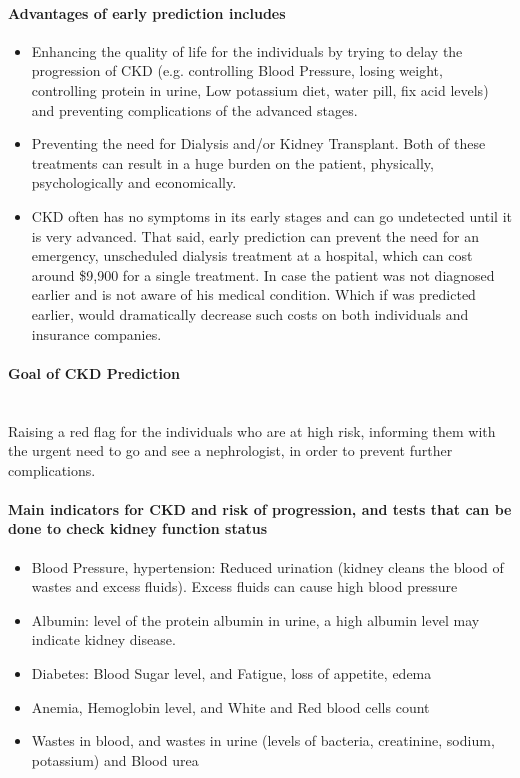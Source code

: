 \documentclass[11pt]{article}
\begin{document}
\paragraph{Advantages of early prediction includes}
\begin{itemize}
\item Enhancing the quality of life for the individuals by trying to delay the progression of CKD (e.g. controlling Blood Pressure, losing weight, controlling protein in urine, Low potassium diet, water pill, fix acid levels) and preventing complications of the advanced stages.
\item Preventing the need for Dialysis and/or Kidney Transplant. Both of these treatments can result in a huge burden on the patient, physically, psychologically and economically. 
\item CKD often has no symptoms in its early stages and can go undetected until it is very advanced. That said, early prediction can prevent the need for an emergency, unscheduled dialysis treatment at a hospital, which can cost around \$9,900 for a single treatment. In case the patient was not diagnosed earlier and is not aware of his medical condition. Which if was predicted earlier, would dramatically decrease such costs on both individuals and insurance companies. 
\end{itemize}

\paragraph{Goal of CKD Prediction} \mbox{}\\
Raising a red flag for the individuals who are at high risk, informing them with the urgent need to go and see a nephrologist, in order to prevent further complications.

\paragraph{Main indicators for CKD and risk of progression, and tests that can be done to check kidney function status}
\begin{itemize}
\item Blood Pressure, hypertension: Reduced urination (kidney cleans the blood of wastes and excess fluids). Excess fluids can cause high blood pressure
\item Albumin: level of the protein albumin in urine, a high albumin level may indicate kidney disease.
\item Diabetes: Blood Sugar level, and Fatigue, loss of appetite, edema
\item Anemia, Hemoglobin level, and White and Red blood cells count 
\item Wastes in blood, and wastes in urine (levels of bacteria, creatinine, sodium, potassium) and Blood urea
\end{itemize}
\end{document}
